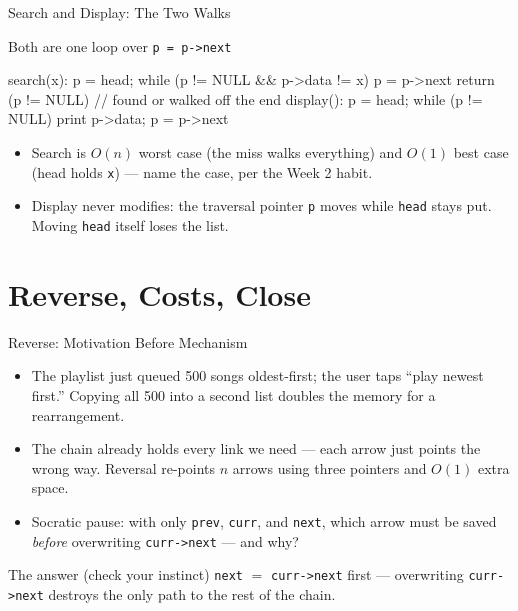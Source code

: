 \documentclass[aspectratio=169]{beamer}
\begin{document}
\begin{frame}[fragile]{Search and Display: The Two Walks}
  \begin{block}{Both are one loop over \texttt{p = p->next}}
\begin{semiverbatim}
search(x):  p = head; while (p != NULL && p->data != x) p = p->next
            return (p != NULL)   // found or walked off the end
display():  p = head; while (p != NULL) { print p->data; p = p->next }
\end{semiverbatim}
  \end{block}
  \begin{itemize}
    \item Search is $O(n)$ worst case (the miss walks everything) and
      $O(1)$ best case (head holds \texttt{x}) --- name the case, per the
      Week 2 habit.
    \item Display never modifies: the traversal pointer \texttt{p} moves
      while \texttt{head} stays put. Moving \texttt{head} itself loses the
      list.
  \end{itemize}
\end{frame}


\section{Reverse, Costs, Close}


\begin{frame}{Reverse: Motivation Before Mechanism}
  \begin{itemize}
    \item The playlist just queued 500 songs oldest-first; the user taps
      ``play newest first.'' Copying all 500 into a second list doubles the
      memory for a rearrangement.
    \item The chain already holds every link we need --- each arrow just
      points the wrong way. Reversal re-points $n$ arrows using three
      pointers and $O(1)$ extra space.
    \item Socratic pause: with only \texttt{prev}, \texttt{curr}, and
      \texttt{next}, which arrow must be saved \emph{before} overwriting
      \texttt{curr->next} --- and why?
  \end{itemize}
  \begin{exampleblock}{The answer (check your instinct)}
    \texttt{next} $=$ \texttt{curr->next} first --- overwriting
    \texttt{curr->next} destroys the only path to the rest of the chain.
  \end{exampleblock}
\end{frame}
\end{document}
